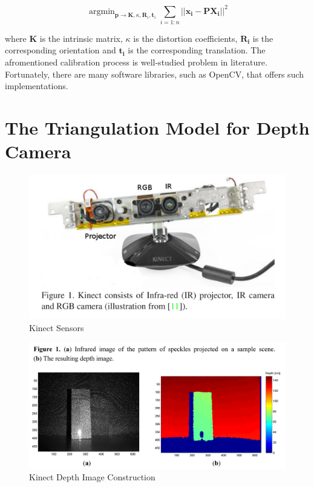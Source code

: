 \documentclass[a4paper]{report}
\numberwithin{figure}{section}
\newcommand{\argmin}{\mathop{\mathrm{argmin}}}
\begin{document}
\begin{equation}
  \argmin_{\mathbf{p} \rightarrow \mathbf{K}, \kappa, \mathbf{R}_i, \mathbf{t}_i}
  \sum_{i=1:n} || \mathbf{x_{i}} - 
  \mathbf{P} \mathbf{X_{i}} ||^2
\end{equation}\label{eq:proj_lsq}

where $\mathbf{K}$ is the intrinsic matrix, 
$\kappa$ is the distortion coefficients, 
$\mathbf{R_i}$ is the corresponding orientation and 
$\mathbf{t_i}$ is the corresponding translation.
The afromentioned calibration process is well-studied problem in literature. 
Fortunately, there are many software libraries, such as OpenCV, 
that offers such implementations.



\section{The Triangulation Model for Depth Camera} \label{sc_depth_model}

\begin{figure}[H]
	\centering
  \includegraphics[width=0.7\linewidth,natwidth=640,natheight=640]
  {fig/ref_imgs/kinect_sensors.png}
  \caption{Kinect Sensors}
	\label{fig:kinect_sensors}
\end{figure}

\begin{figure}[H]
	\centering
  \includegraphics[width=0.7\linewidth,natwidth=640,natheight=640]
  {fig/ref_imgs/kinect_depth_img.png}
  \caption{Kinect Depth Image Construction}
	\label{fig:kinect_depth_img}
\end{figure}
\end{document}
